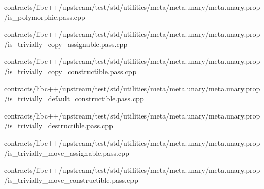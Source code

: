 \begin{DoxyCompactItemize}
contracts/libc++/upstream/test/std/utilities/meta/meta.\+unary/meta.\+unary.\+prop/is\+\_\+polymorphic.\+pass.\+cpp\item 
contracts/libc++/upstream/test/std/utilities/meta/meta.\+unary/meta.\+unary.\+prop/is\+\_\+trivially\+\_\+copy\+\_\+assignable.\+pass.\+cpp\item 
contracts/libc++/upstream/test/std/utilities/meta/meta.\+unary/meta.\+unary.\+prop/is\+\_\+trivially\+\_\+copy\+\_\+constructible.\+pass.\+cpp\item 
contracts/libc++/upstream/test/std/utilities/meta/meta.\+unary/meta.\+unary.\+prop/is\+\_\+trivially\+\_\+default\+\_\+constructible.\+pass.\+cpp\item 
contracts/libc++/upstream/test/std/utilities/meta/meta.\+unary/meta.\+unary.\+prop/is\+\_\+trivially\+\_\+destructible.\+pass.\+cpp\item 
contracts/libc++/upstream/test/std/utilities/meta/meta.\+unary/meta.\+unary.\+prop/is\+\_\+trivially\+\_\+move\+\_\+assignable.\+pass.\+cpp\item 
contracts/libc++/upstream/test/std/utilities/meta/meta.\+unary/meta.\+unary.\+prop/is\+\_\+trivially\+\_\+move\+\_\+constructible.\+pass.\+cpp\end{DoxyCompactItemize}
